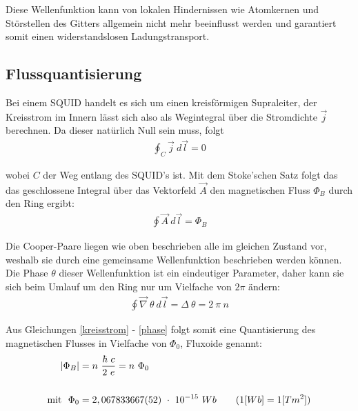 \documentclass[12pt]{article}
\begin{document}
Diese Wellenfunktion kann von lokalen Hindernissen wie Atomkernen und Störstellen des Gitters allgemein nicht mehr beeinflusst werden und garantiert somit einen widerstandslosen Ladungstransport.

\subsection{Flussquantisierung}
\label{flussquantisierung}

Bei einem SQUID handelt es sich um einen kreisförmigen Supraleiter, der Kreisstrom im Innern lässt sich also als Wegintegral über die Stromdichte $\vec{j}$ berechnen. Da dieser natürlich Null sein muss, folgt
\begin{align}
 \label{kreisstrom} \oint_C \vec j ~ d\vec l = 0
\end{align}

wobei $C$ der Weg entlang des SQUID's ist. Mit dem Stoke'schen Satz folgt das das geschlossene Integral über das Vektorfeld $\vec A$ den magnetischen Fluss $\Phi_B$ durch den Ring ergibt:
\begin{align}
 \oint\vec A~d\vec l = \Phi_B
\end{align}

Die Cooper-Paare liegen wie oben beschrieben alle im gleichen Zustand vor, weshalb sie durch eine gemeinsame Wellenfunktion beschrieben werden können. Die Phase $\theta$ dieser Wellenfunktion ist ein eindeutiger Parameter, daher kann sie sich beim Umlauf um den Ring nur um Vielfache von $2\pi$ ändern:
\begin{align}
\label{phase}\oint \vec\nabla~\theta~d\vec l = \Delta~\theta = 2~\pi~n
\end{align}

Aus Gleichungen \ref{kreisstrom} - \ref{phase} folgt somit eine Quantisierung des magnetischen Flusses in Vielfache von $\Phi_0$, Fluxoide genannt:
\begin{align}
  \left|\Phi_B\right| &= n~\frac{\hbar~c}{2~e} = n~\Phi_0 \\
\notag \\
\notag \textnormal{mit}~~\Phi_0 &= 2,067833667(52)~\cdot~10^{-15} ~ Wb \quad \quad (1[Wb] = 1[Tm^2])
\end{align}

\newpage
\end{document}
